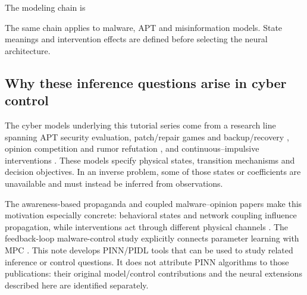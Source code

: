 \documentclass[11pt,a4paper]{article}
\theoremstyle{definition}
\theoremstyle{remark}
\begin{document}
The modeling chain is
\begin{center}
\end{center}
The same chain applies to malware, APT and misinformation models. State meanings and intervention effects are defined before selecting the neural architecture.


\subsection{Why these inference questions arise in cyber control}
The cyber models underlying this tutorial series come from a research line spanning APT security evaluation, patch/repair games and backup/recovery \cite{security2017,patch2018,repair2019,backup2021}, opinion competition and rumor refutation \cite{opinions2020,rumor2021}, and continuous--impulsive interventions \cite{impulse2023,outsource2024,war2024}. These models specify physical states, transition mechanisms and decision objectives. In an inverse problem, some of those states or coefficients are unavailable and must instead be inferred from observations.

The awareness-based propaganda and coupled malware--opinion papers make this motivation especially concrete: behavioral states and network coupling influence propagation, while interventions act through different physical channels \cite{awareness2025,malware2025}. The feedback-loop malware-control study explicitly connects parameter learning with MPC \cite{feedback2024}. This note develops PINN/PIDL tools that can be used to study related inference or control questions. It does not attribute PINN algorithms to those publications: their original model/control contributions and the neural extensions described here are identified separately.
\end{document}

